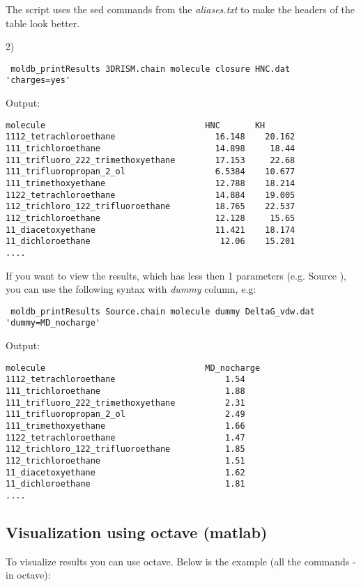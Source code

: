 \documentclass[12pt]{article}
\begin{document}
The script uses the sed commands from the \emph{aliases.txt} to make the headers of the table look better.


2)

\verb$ moldb_printResults 3DRISM.chain molecule closure HNC.dat  'charges=yes' $

Output:
\begin{verbatim}
molecule                                HNC       KH        
1112_tetrachloroethane                    16.148    20.162  
111_trichloroethane                       14.898     18.44  
111_trifluoro_222_trimethoxyethane        17.153     22.68  
111_trifluoropropan_2_ol                  6.5384    10.677  
111_trimethoxyethane                      12.788    18.214  
1122_tetrachloroethane                    14.884    19.005  
112_trichloro_122_trifluoroethane         18.765    22.537  
112_trichloroethane                       12.128     15.65  
11_diacetoxyethane                        11.421    18.174  
11_dichloroethane                          12.06    15.201  
....

\end{verbatim}

If you want to view the results, which has less then 1 parameters (e.g. Source ), you can use the following syntax with \emph{dummy} column, e.g:

\verb# moldb_printResults Source.chain molecule dummy DeltaG_vdw.dat 'dummy=MD_nocharge'  #

Output:

\begin{verbatim}
molecule                                MD_nocharge 
1112_tetrachloroethane                      1.54    
111_trichloroethane                         1.88    
111_trifluoro_222_trimethoxyethane          2.31    
111_trifluoropropan_2_ol                    2.49    
111_trimethoxyethane                        1.66    
1122_tetrachloroethane                      1.47    
112_trichloro_122_trifluoroethane           1.85    
112_trichloroethane                         1.51    
11_diacetoxyethane                          1.62    
11_dichloroethane                           1.81    
....
\end{verbatim}

\subsection{Visualization using octave (matlab)}

To visualize results you can use octave.
Below is the example (all the commands - in octave):
\end{document}

